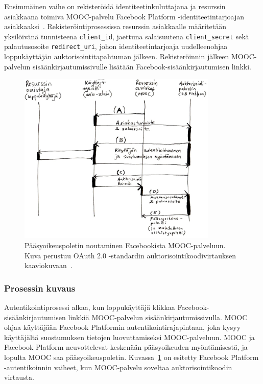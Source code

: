 \documentclass[finnish,gradu]{tktltiki}
\begin{document}
  Ensimmäinen vaihe on rekisteröidä identiteetinkuluttajana ja resurssin asiakkaana toimiva MOOC-palvelu Facebook Platform -identiteetin\-tarjoajan asiakkaaksi~\cite{facebook_oauth2_doc}. Rekisteröintiprosessissa resurssin asiakkaalle määritetään yksilöivänä tunnisteena \verb!client_id!, jaettuna salaisuutena \verb!client_secret! sekä palautusosoite \verb!redirect_uri!, johon identiteetintarjoaja uudelleenohjaa loppukäyttäjän auktorisointitapahtuman jälkeen. Rekisteröinnin jälkeen MOOC-palvelun sisäänkirjautumissivulle lisätään Fa\-ce\-book-si\-sään\-kirjautumisen linkki.

  \begin{figure}[h!]
    \centering
    \includegraphics[width=0.85\textwidth]{images/fb_auth_sekvenssi.jpg}
    \caption[Pääsyoikeuspoletin noutaminen Facebookista MOOC-palveluun.]{Pääsyoikeuspoletin noutaminen Facebookista MOOC-palveluun. Kuva perustuu OAuth 2.0 -standardin auktorisointikoodivirtauksen kaaviokuvaan~\cite{ietf_oauth2}.}
    \label{fig:oauth_auth_code_flow}
  \end{figure}

  \subsubsection{Prosessin kuvaus} %
  \label{ssub:autentikoinnin_vaiheet_facebook_platform_palveluun}

  Autentikointiprosessi alkaa, kun loppukäyttäjä klikkaa Facebook-sisään\-kirjau\-tumi\-sen linkkiä MOOC-palvelun sisäänkirjautumissivulla. MOOC ohjaa käyttäjään Facebook Platformin autentikointirajapintaan, joka kysyy käyttäjältä suostumuksen tietojen luovuttamiseksi MOOC-palveluun. MOOC ja Facebook Platform neuvottelevat keskenään pääsyoikeuden myöntämisestä, ja lopulta MOOC saa pääsyoikeuspoletin. Kuvassa~\ref{fig:oauth_auth_code_flow} on esitetty Facebook Platform -autentikoinnin vaiheet, kun MOOC-palvelu soveltaa auktorisointikoodin virtausta.
\end{document}
